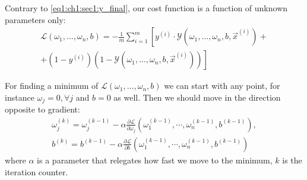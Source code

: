 Contrary to \cref{eq1:ch1:sec1:y_final}, our cost function is a function of
unknown parameters only:
\begin{eqnarray}
  \mathcal{L}\left(\omega_1, \dots, \omega_n, b\right) = - \frac{1}{m} \sum_{i =
    1}^{m} \left[ y^{(i)} \cdot \mathcal{Y}\left(\omega_1, \dots, \omega_n, b,
    \vec{x}^{(i)}\right) + \right.
    \nonumber \\
    \left. + 
(1-y^{(i)}) \left(1 - \mathcal{Y}\left(\omega_1, \dots, \omega_n, b, \vec{x}^{(i)}\right)\right)\right]
  \label{eq:ch1:sec1:cost_func_total_params}
\end{eqnarray}

For finding a minimum of $\mathcal{L}\left(\omega_1, \dots, \omega_n, b\right)$
we can start with any point, for instance $\omega_j = 0, \forall j$ and $b = 0$
as well. Then we should move in the direction opposite to gradient:
\begin{eqnarray}
  \omega_j^{(k)} = \omega_j^{(k-1)} - \alpha \frac{\partial
    \mathcal{L}}{\partial \omega_j}\left(\omega_1^{(k-1)}, \cdots,
  \omega_n^{(k-1)}, b^{(k-1)}\right),
  \nonumber \\
  b^{(k)} = b^{(k-1)}  - \alpha \frac{\partial
    \mathcal{L}}{\partial b}\left(\omega_1^{(k-1)}, \cdots,
  \omega_n^{(k-1)}, b^{(k-1)}\right)
  \nonumber
\end{eqnarray}
where $\alpha$ is a parameter that relegates how fast we move to the minimum,
$k$ is the iteration counter.

